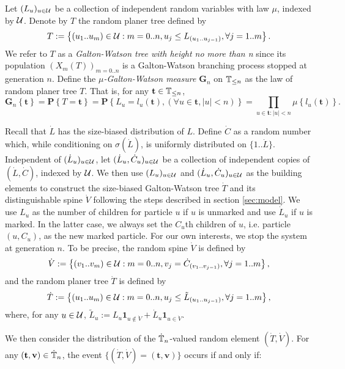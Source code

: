 \documentclass[12pt]{amsart}
\theoremstyle{remark}
\numberwithin{equation}{section}
\newcommand{\defn}[1]{{\em #1}}
\newcommand{\ind}[1]{\mathbf 1_{#1}}
\newcommand{\prob}{\mathbf P}
\newcommand{\set}[1]{\left\{ #1 \right\}}
\newcommand{\tree}{\mathbf t}
\newcommand{\spine}{\mathbf v}
\newcommand{\bG}{\mathbf G}\newcommand{\bbG}{\mathbb G}\newcommand{\cG}{\mathcal G}
\begin{document}
\par
	Let $(L_u)_{u\in\mathcal U}$ be a collection of independent random variables with law $\mu$, indexed by $\mathcal U$. Denote by $T$ the random planer tree defined by
\begin{equation*}
		T
	:=
		\set{(u_1..u_m)\in \cU: m=0..n, u_j\leq L_{(u_1..u_{j-1})},\forall j=1..m}. 
\end{equation*}
	We refer to $T$ as a \defn{Galton-Watson tree with height no more than n} since its population $(X_m(T))_{m=0..n}$ is a Galton-Watson branching process stopped at generation $n$. Define the \defn{$\mu$-Galton-Watson measure $\bG_n$} on $\mathbb T_{\leq n}$ as the law of random planer tree $T$. That is, for any $\tree\in\bbT_{\leq n}$,
\begin{equation*}
		\bG_n\set{\tree}
	=
		\prob\set{T=\tree}
	=
		\prob\set{L_u=l_u(\tree),(\forall u\in\tree,|u|<n)}
	=
		\prod_{u\in \tree:|u|<n}\mu\set{l_u(\tree)}.
\end{equation*}
\par
	Recall that $\dot L$ has the size-biased distribution of $L$. Define $\dot C$ as a random number which, while conditioning on $\sigma(\dot L)$, is uniformly distributed on $\{1..\dot L\}$. Independent of $(\dot L_u)_{u\in\mathcal U}$, let $(\dot L_u,\dot C_u)_{u\in \mathcal U}$ be a collection of independent copies of $(\dot L,\dot C)$, indexed by $\mathcal U$.  We then use $(L_u)_{u\in\mathcal U}$ and $(\dot L_u,\dot C_u)_{u\in\mathcal U}$ as the building elements to construct the size-biased Galton-Watson tree $\dot T$ and its distinguishable spine $\dot V$ following the steps described in section \ref{sec:model}. We use $L_u$ as the number of children for particle $u$ if $u$ is unmarked and use $\dot L_u$ if $u$ is marked. In the latter case, we always set the $C_u$th children of $u$, i.e. particle $(u,C_u)$, as the new marked particle. For our own interests, we stop the system at generation $n$. To be precise, the random spine $\dot V$ is defined by
\begin{equation*}
		\dot V
	:=
		\set{(v_1..v_m)\in \cU:m=0..n, v_j=\dot C_{(v_1..v_{j-1})},\forall j=1..m},
\end{equation*}
	and the random planer tree $\dot T$ is defined by
\begin{equation*}
	\dot T:=\set{(u_1..u_m)\in\cU: m=0..n,u_j\leq \tilde L_{(u_1..u_{j-1})},\forall j=1..m},
\end{equation*}
	where, for any $u\in\mathcal U$, $\tilde L_u:=L_u\ind{u\not\in \dot V}+\dot L_u\ind{u\in \dot V}$. 
\par
	We then consider the distribution of the $\dot{\mathbb T}_n$-valued random element $(\dot T,\dot V)$. For any $(\tree,\spine)\in\dot\bbT_n$, the event $\{(\dot T,\dot V)=(\tree,\spine)\}$ occurs if and only if:
\end{document}
